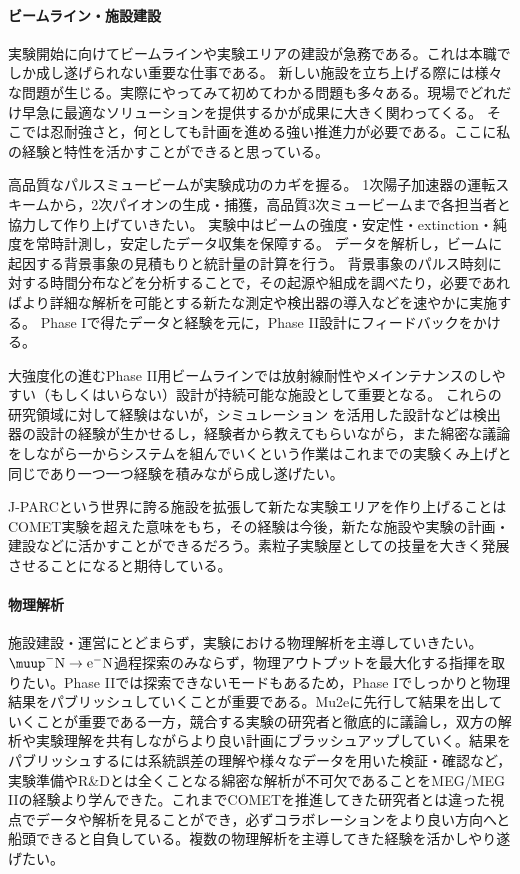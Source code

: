 \paragraph{ビームライン・施設建設}
実験開始に向けてビームラインや実験エリアの建設が急務である。これは本職でしか成し遂げられない重要な仕事である。
新しい施設を立ち上げる際には様々な問題が生じる。実際にやってみて初めてわかる問題も多々ある。現場でどれだけ早急に最適なソリューションを提供するかが成果に大きく関わってくる。
そこでは忍耐強さと，何としても計画を進める強い推進力が必要である。ここに私の経験と特性を活かすことができると思っている。


高品質なパルスミュービームが実験成功のカギを握る。
1次陽子加速器の運転スキームから，2次パイオンの生成・捕獲，高品質3次ミュービームまで各担当者と協力して作り上げていきたい。
実験中はビームの強度・安定性・extinction・純度を常時計測し，安定したデータ収集を保障する。
データを解析し，ビームに起因する背景事象の見積もりと統計量の計算を行う。
背景事象のパルス時刻に対する時間分布などを分析することで，その起源や組成を調べたり，必要であればより詳細な解析を可能とする新たな測定や検出器の導入などを速やかに実施する。
Phase Iで得たデータと経験を元に，Phase II設計にフィードバックをかける。

大強度化の進むPhase II用ビームラインでは放射線耐性やメインテナンスのしやすい（もしくはいらない）設計が持続可能な施設として重要となる。
これらの研究領域に対して経験はないが，シミュレーション
を活用した設計などは検出器の設計の経験が生かせるし，経験者から教えてもらいながら，また綿密な議論をしながら一からシステムを組んでいくという作業はこれまでの実験くみ上げと同じであり一つ一つ経験を積みながら成し遂げたい。

J-PARCという世界に誇る施設を拡張して新たな実験エリアを作り上げることはCOMET実験を超えた意味をもち，その経験は今後，新たな施設や実験の計画・建設などに活かすことができるだろう。素粒子実験屋としての技量を大きく発展させることになると期待している。

\paragraph{物理解析}
施設建設・運営にとどまらず，実験における物理解析を主導していきたい。
$\muup^-\mathrm{N}\to\mathrm{e^-N}$過程探索のみならず，物理アウトプットを最大化する指揮を取りたい。Phase IIでは探索できないモードもあるため，Phase Iでしっかりと物理結果をパブリッシュしていくことが重要である。Mu2eに先行して結果を出していくことが重要である一方，競合する実験の研究者と徹底的に議論し，双方の解析や実験理解を共有しながらより良い計画にブラッシュアップしていく。結果をパブリッシュするには系統誤差の理解や様々なデータを用いた検証・確認など，実験準備やR\&Dとは全くことなる綿密な解析が不可欠であることをMEG/MEG IIの経験より学んできた。これまでCOMETを推進してきた研究者とは違った視点でデータや解析を見ることができ，必ずコラボレーションをより良い方向へと船頭できると自負している。複数の物理解析を主導してきた経験を活かしやり遂げたい。


